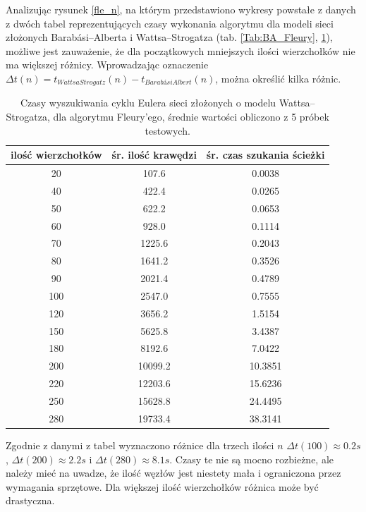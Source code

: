 \documentclass[a4paper, 12pt, twoside, openright]{article}
\begin{document}
Analizując rysunek \ref{fle_n}, na którym przedstawiono wykresy powstałe z danych z dwóch tabel reprezentujących czasy wykonania algorytmu dla modeli sieci złożonych Barabási–Alberta i Wattsa–Strogatza (tab. \ref{Tab:BA_Fleury}, \ref{Tab:WS_Fleury}), możliwe jest zauważenie, że dla początkowych mniejszych ilości wierzchołków nie ma większej różnicy. Wprowadzając oznaczenie $\Delta t(n) = t_{WattsaStrogatz}(n) - t_{BarabásiAlbert}(n)$, można określić kilka różnic.
\\
\begin{table}[ht]
	\centering
	\caption{Czasy wyszukiwania cyklu Eulera sieci złożonych o modelu Wattsa–Strogatza, dla algorytmu Fleury'ego, średnie wartości obliczono z 5 próbek testowych.}
	
	\resizebox{14.5cm}{!}
	{
	\begin{tabular}{|c c c|}
		\hline
		ilość wierzchołków	& śr. ilość krawędzi 	& śr. czas szukania ścieżki	\\ \hline \hline
		20 	& 107.6 	 	& 0.0038	\\ \hline
		40 	& 422.4 		& 0.0265	\\ \hline
		50 	& 622.2 	 	& 0.0653	\\ \hline
		60 	& 928.0 		& 0.1114	\\ \hline
		70 	& 1225.6      	& 0.2043	\\ \hline
		80 	& 1641.2     	& 0.3526	\\ \hline
		90  & 2021.4    	& 0.4789	\\ \hline
		100 & 2547.0    	& 0.7555	\\ \hline
		120 & 3656.2    	& 1.5154	\\ \hline
		150 & 5625.8   		& 3.4387	\\ \hline
		180 & 8192.6     	& 7.0422	\\ \hline
		200 & 10099.2 		& 10.3851	\\ \hline
		220 & 12203.6 		& 15.6236	\\ \hline
		250 & 15628.8 		& 24.4495	\\ \hline
		280 & 19733.4 		& 38.3141	\\ \hline
	\end{tabular} 
	}
	\label{Tab:WS_Fleury}
\end{table}
	
	Zgodnie z danymi z tabel wyznaczono różnice dla trzech ilości $n$ $\Delta t(100) \approx 0.2s $, $\Delta t(200) \approx 2.2s $ i  $\Delta t(280) \approx 8.1s$. Czasy te nie są mocno rozbieżne, ale należy mieć na uwadze, że ilość węzłów jest niestety mała i ograniczona przez wymagania sprzętowe. Dla większej ilość wierzchołków różnica może być drastyczna.
\end{document}
